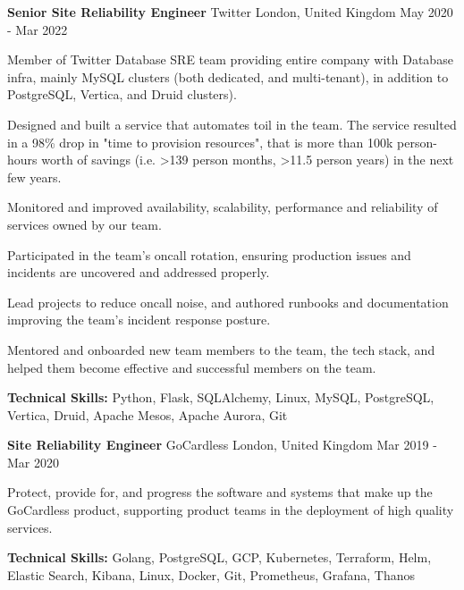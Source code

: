 \begin{cventries}
	\cventry
	{\textbf{Senior Site Reliability Engineer}} %
	{Twitter} %
	{London, United Kingdom} %
	{May 2020 - Mar 2022} %
	{
		\begin{cvitems} %
			\item {Member of Twitter Database SRE team providing entire company with Database infra, mainly MySQL clusters
			            (both dedicated, and multi-tenant), in addition to PostgreSQL, Vertica, and Druid clusters).}
			\item {Designed and built a service that automates toil in the team. The service resulted in a 98\% drop in "time
			            to provision resources", that is more than 100k person-hours worth of savings (i.e. >139 person
			            months, >11.5 person years) in the next few years.}
			\item {Monitored and improved availability, scalability, performance and reliability of services owned by our
			            team.}
			\item {Participated in the team's oncall rotation, ensuring production issues and incidents are uncovered and
			            addressed properly.}
			\item {Lead projects to reduce oncall noise, and authored runbooks and documentation improving the team's incident
			            response posture.}
			\item {Mentored and onboarded new team members to the team, the tech stack, and helped them become effective and
			            successful members on the team.}
			\item {\textbf{Technical Skills:} Python, Flask, SQLAlchemy, Linux, MySQL, PostgreSQL, Vertica, Druid, Apache
			            Mesos, Apache Aurora, Git}
		\end{cvitems}
	}

	\cventry
	{\textbf{Site Reliability Engineer}} %
	{GoCardless} %
	{London, United Kingdom} %
	{Mar 2019 - Mar 2020} %
	{
		\begin{cvitems} %
			\item {Protect, provide for, and progress the software and systems that make up the GoCardless product, supporting
			            product teams in the deployment of high quality services.}
			\item {\textbf{Technical Skills:} Golang, PostgreSQL, GCP, Kubernetes, Terraform, Helm, Elastic Search, Kibana,
			            Linux, Docker, Git, Prometheus, Grafana, Thanos}
		\end{cvitems}
	}


\end{cventries}
